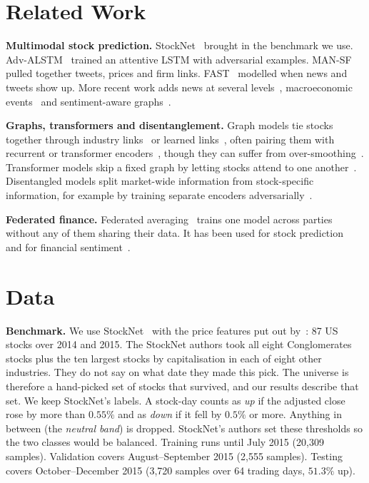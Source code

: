 \documentclass[conference]{IEEEtran}
\begin{document}
\section{Related Work}

\textbf{Multimodal stock prediction.} StockNet~\cite{xu2018stocknet} brought in the
benchmark we use. Adv-ALSTM~\cite{feng2019advalstm} trained an attentive LSTM with
adversarial examples. MAN-SF~\cite{sawhney2020mansf} pulled together tweets, prices and
firm links. FAST~\cite{sawhney2021fast} modelled when news and tweets show up. More
recent work adds news at several levels~\cite{ang2022guided}, macroeconomic
events~\cite{zhang2025camef} and sentiment-aware
graphs~\cite{zhang2025gnnsentiment,nguyen2025dasf}.

\textbf{Graphs, transformers and disentanglement.} Graph models tie stocks together
through industry links~\cite{chen2018gcn,feng2019rsr} or learned
links~\cite{cheng2022multimodality,liu2025multimodal,hu2025differential,niu2025ngat},
often pairing them with recurrent or transformer
encoders~\cite{sonani2025hybrid,zhu2025msgformer}, though they can suffer from
over-smoothing~\cite{li2018deeper}. Transformer models skip a fixed graph by letting
stocks attend to one another~\cite{yoo2021dtml,li2024master}. Disentangled models split
market-wide information from stock-specific information, for example by training
separate encoders adversarially~\cite{tang2020add}.

\textbf{Federated finance.} Federated averaging~\cite{mcmahan2017fedavg} trains one
model across parties without any of them sharing their data. It has been used for stock
prediction~\cite{kumarappan2024federated,noseda2025federated} and for financial
sentiment~\cite{zhong2025financial}.

\section{Data}

\textbf{Benchmark.} We use StockNet~\cite{xu2018stocknet} with the price features put
out by~\cite{feng2019advalstm}: 87 US stocks over 2014 and 2015. The StockNet authors
took all eight Conglomerates stocks plus the ten largest stocks by capitalisation in
each of eight other industries. They do not say on what date they made this pick. The
universe is therefore a hand-picked set of stocks that survived, and our results
describe that set. We keep StockNet's labels. A stock-day counts as \emph{up} if the
adjusted close rose by more than $0.55\%$ and as \emph{down} if it fell by $0.5\%$ or
more. Anything in between (the \emph{neutral band}) is dropped. StockNet's authors set
these thresholds so the two classes would be balanced. Training runs until July 2015
(20{,}309 samples). Validation covers August--September 2015 (2{,}555 samples).
Testing covers October--December 2015 (3{,}720 samples over 64 trading days, $51.3\%$
up).
\end{document}
